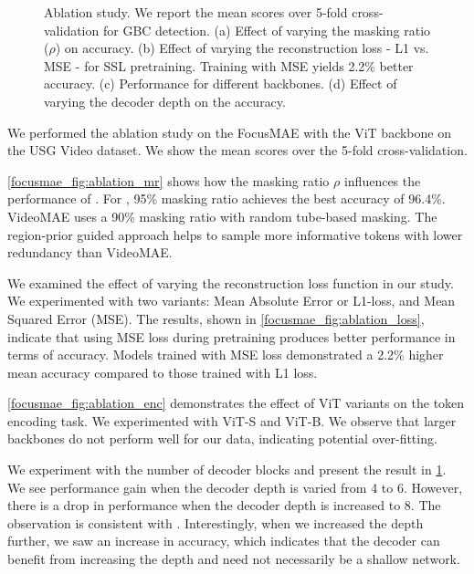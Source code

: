 \begin{figure}[!t]
\begin{subfigure}[b]{0.23\linewidth}
		\caption{}
		\label{focusmae_fig:ablation_dec}
	\end{subfigure}
	\caption[Ablation study on \focusmae]{Ablation study. We report the mean scores over 5-fold cross-validation for GBC detection. (a) Effect of varying the masking ratio ($\rho$) on accuracy. (b) Effect of varying the reconstruction loss - L1 vs. MSE - for SSL pretraining. Training with MSE yields 2.2\% better accuracy. (c) Performance for different backbones. (d) Effect of varying the decoder depth on the accuracy. }
	\label{focusmae_fig:ablation}
\end{figure}



%
We performed the ablation study on the FocusMAE with the ViT backbone on the USG Video dataset. We show the mean scores over the 5-fold cross-validation.

%
\cref{focusmae_fig:ablation_mr} shows how the masking ratio $\rho$ influences the performance of \focusmae. For \focusmae, 95\% masking ratio achieves the best accuracy of 96.4\%. VideoMAE uses a 90\% masking ratio with random tube-based masking. The region-prior guided approach helps \focusmae to sample more informative tokens with lower redundancy than VideoMAE.

%
We examined the effect of varying the reconstruction loss function in our study. We experimented with two variants: Mean Absolute Error or L1-loss, and Mean Squared Error (MSE). The results, shown in \cref{focusmae_fig:ablation_loss}, indicate that using MSE loss during pretraining produces better performance in terms of accuracy. Models trained with MSE loss demonstrated a 2.2\% higher mean accuracy compared to those trained with L1 loss.

%
\cref{focusmae_fig:ablation_enc} demonstrates the effect of ViT variants on the token encoding task. We experimented with ViT-S and ViT-B. We observe that larger backbones do not perform well for our data, indicating potential over-fitting.

%
We experiment with the number of decoder blocks and present the result in \cref{focusmae_fig:ablation_dec}. We see performance gain when the decoder depth is varied from 4 to 6. However, there is a drop in performance when the decoder depth is increased to 8. The observation is consistent with \cite{videomae, adamae}. Interestingly, when we increased the depth further, we saw an increase in accuracy, which indicates that the decoder can benefit from increasing the depth and need not necessarily be a shallow network. 

